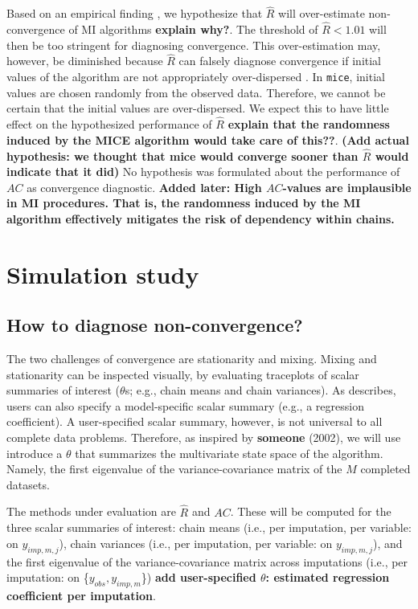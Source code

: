 \documentclass[Royal,times,sageh]{sagej}
\begin{document}
Based on an empirical finding \citep{lace07}, we hypothesize that
\(\widehat{R}\) will over-estimate non-convergence of MI algorithms
\textbf{explain why?}. The threshold of \(\widehat{R} < 1.01\) will then
be too stringent for diagnosing convergence. This over-estimation may,
however, be diminished because \(\widehat{R}\) can falsely diagnose
convergence if initial values of the algorithm are not appropriately
over-dispersed \citep[p.~437]{broo98}. In \texttt{mice}, initial values
are chosen randomly from the observed data. Therefore, we cannot be
certain that the initial values are over-dispersed. We expect this to
have little effect on the hypothesized performance of \(\widehat{R}\)
\textbf{explain that the randomness induced by the MICE algorithm would
take care of this??}. \textbf{(Add actual hypothesis: we thought that
mice would converge sooner than \(\widehat{R}\) would indicate that it
did)} No hypothesis was formulated about the performance of \(AC\) as
convergence diagnostic. \textbf{Added later: High \(AC\)-values are
implausible in MI procedures. That is, the randomness induced by the MI
algorithm effectively mitigates the risk of dependency within chains.}

\hypertarget{simulation-study}{%
\section{Simulation study}\label{simulation-study}}

\hypertarget{how-to-diagnose-non-convergence}{%
\subsection{How to diagnose
non-convergence?}\label{how-to-diagnose-non-convergence}}

The two challenges of convergence are stationarity and mixing. Mixing
and stationarity can be inspected visually, by evaluating traceplots of
scalar summaries of interest (\(\theta\)s; e.g., chain means and chain
variances). As \citet{buur18} describes, users can also specify a
model-specific scalar summary (e.g., a regression coefficient). A
user-specified scalar summary, however, is not universal to all complete
data problems. Therefore, as inspired by \textbf{someone} (2002), we
will use introduce a \(\theta\) that summarizes the multivariate state
space of the algorithm. Namely, the first eigenvalue of the
variance-covariance matrix of the \(M\) completed datasets.

The methods under evaluation are \(\widehat{R}\) and \(AC\). These will
be computed for the three scalar summaries of interest: chain means
(i.e., per imputation, per variable: on \(y_{imp, m, j}\)), chain
variances (i.e., per imputation, per variable: on \(y_{imp, m, j}\)),
and the first eigenvalue of the variance-covariance matrix across
imputations (i.e., per imputation: on \{\(y_{obs}, y_{imp, m}\)\})
\textbf{add user-specified \(\theta\): estimated regression coefficient
per imputation}.
\end{document}
